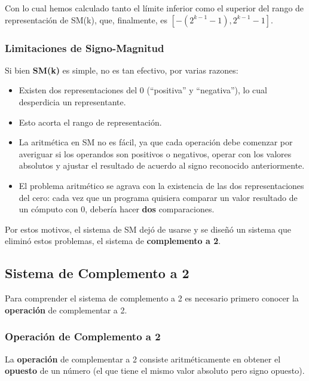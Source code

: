 \documentclass[spanish,a4paper,]{article}
\providecommand{\tightlist}{%
  \setlength{\itemsep}{0pt}\setlength{\parskip}{0pt}}
\begin{document}
Con lo cual hemos calculado tanto el límite inferior como el superior
del rango de representación de SM(k), que, finalmente, es
\([-(2^{k-1}-1),2^{k-1}-1]\).

\hypertarget{limitaciones-de-signo-magnitud}{%
\subsubsection{Limitaciones de
Signo-Magnitud}\label{limitaciones-de-signo-magnitud}}

Si bien \textbf{SM(k)} es simple, no es tan efectivo, por varias
razones:

\begin{itemize}
\tightlist
\item
  Existen dos representaciones del 0 (``positiva'' y ``negativa''), lo
  cual desperdicia un representante.
\item
  Esto acorta el rango de representación.
\item
  La aritmética en SM no es fácil, ya que cada operación debe comenzar
  por averiguar si los operandos son positivos o negativos, operar con
  los valores absolutos y ajustar el resultado de acuerdo al signo
  reconocido anteriormente.
\item
  El problema aritmético se agrava con la existencia de las dos
  representaciones del cero: cada vez que un programa quisiera comparar
  un valor resultado de un cómputo con 0, debería hacer \textbf{dos}
  comparaciones.
\end{itemize}

Por estos motivos, el sistema de SM dejó de usarse y se diseñó un
sistema que eliminó estos problemas, el sistema de \textbf{complemento a
2}.

\hypertarget{sistema-de-complemento-a-2}{%
\subsection{Sistema de Complemento a
2}\label{sistema-de-complemento-a-2}}

Para comprender el sistema de complemento a 2 es necesario primero
conocer la \textbf{operación} de complementar a 2.

\hypertarget{operaciuxf3n-de-complemento-a-2}{%
\subsubsection{Operación de Complemento a
2}\label{operaciuxf3n-de-complemento-a-2}}

La \textbf{operación} de complementar a 2 consiste aritméticamente en
obtener el \textbf{opuesto} de un número (el que tiene el mismo valor
absoluto pero signo opuesto).
\end{document}
